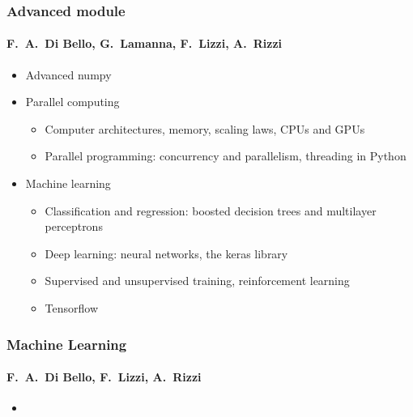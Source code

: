 \documentclass[9pt]{beamer}
\begin{document}
\begin{frame}
  \frametitle{Advanced module}
  \framesubtitle{F.~A.~Di Bello, G.~Lamanna, F.~Lizzi, A.~Rizzi}
  \begin{itemize}
  \item Advanced numpy
  \item Parallel computing
    \begin{itemize}
    \item Computer architectures, memory, scaling laws, CPUs and GPUs
    \item Parallel programming: concurrency and parallelism, threading in Python
    \end{itemize}
  \item Machine learning
    \begin{itemize}
    \item Classification and regression: boosted decision trees and
      multilayer perceptrons
    \item Deep learning: neural networks, the keras library
    \item Supervised and unsupervised training, reinforcement learning
    \item Tensorflow
    \end{itemize}
  \end{itemize}
\end{frame}


\begin{frame}
  \frametitle{Machine Learning}
  \framesubtitle{F.~A.~Di Bello, F.~Lizzi, A.~Rizzi}
  \begin{itemize}
    \item
  \end{itemize}
\end{frame}
\end{document}
